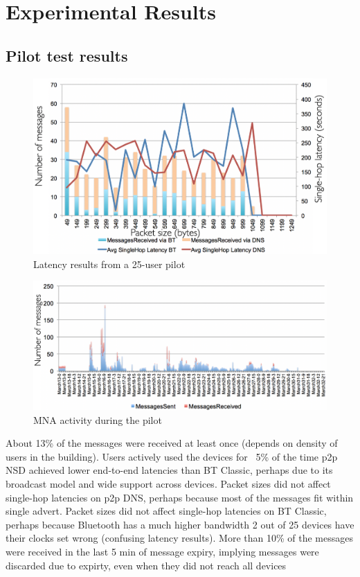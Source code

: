\documentclass[conference]{IEEEtran}
\begin{document}
\section{Experimental Results}
\label{sec:eval}
%

%

%

%
\subsection{Pilot test results}
\label{sec:romania}
%
\begin{figure}[htbp]
\centerline{\includegraphics[width=\columnwidth]{figs/romania_latency}}
\caption{Latency results from a 25-user pilot}
\label{fig:romania_lat}
\end{figure}

\begin{figure}[htbp]
\centerline{\includegraphics[width=\columnwidth]{figs/romania_activity}}
\caption{MNA activity during the pilot}
\label{fig:romania_act}
\end{figure}


About 13\% of the messages were received at least once (depends on
density of users in the building). Users actively used the devices for
~5\% of the time p2p NSD achieved lower end-to-end latencies than BT
Classic, perhaps due to its broadcast model and wide support across
devices. Packet sizes did not affect single-hop latencies on p2p DNS,
perhaps because most of the messages fit within single advert. Packet
sizes did not affect single-hop latencies on BT Classic, perhaps
because Bluetooth has a much higher bandwidth 2 out of 25 devices have
their clocks set wrong (confusing latency results). More than 10\% of
the messages were received in the last 5 min of message expiry,
implying messages were discarded due to expirty, even when they did
not reach all devices
\end{document}
